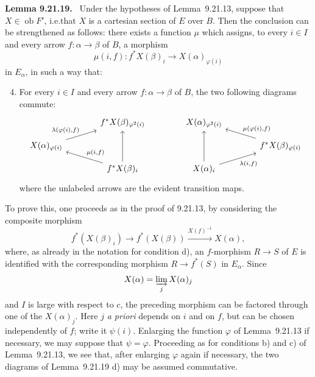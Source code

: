 \documentclass[11pt]{article}
\newcommand{\ob}{\operatorname{ob}}
\newcommand{\ie}{i.e.}
\newenvironment{statement}[1]{\par\medskip\noindent\textbf{#1.}\ }{\par\medskip}
\begin{document}
\begin{statement}{Lemma 9.21.19}
Under the hypotheses of Lemma~9.21.13, suppose that $X\in\ob F'$, \ie that $X$ is a cartesian section of $E$ over $B$. Then the conclusion can be strengthened as follows: there exists a function $\mu$ which assigns, to every $i\in I$ and every arrow $f:\alpha\to\beta$ of $B$, a morphism
\[
 \mu(i,f):f^\ast X(\beta)_i\longrightarrow X(\alpha)_{\varphi(i)}
\]
in $E_\alpha$, in such a way that:
\begin{enumerate}[label=\alph*)]
\setcounter{enumi}{3}
\item For every $i\in I$ and every arrow $f:\alpha\to\beta$ of $B$, the two following diagrams commute:
\[
\begin{tikzcd}[column sep=large,row sep=small]
& f^\ast X(\beta)_{\varphi^2(i)}\\
X(\alpha)_{\varphi(i)} \arrow[ru,"{\lambda(\varphi(i),f)}"] &\\
& f^\ast X(\beta)_i \arrow[lu,"{\mu(i,f)}"'] \arrow[uu]
\end{tikzcd}
\qquad\qquad
\begin{tikzcd}[column sep=large,row sep=small]
X(\alpha)_{\varphi^2(i)} &\\
& f^\ast X(\beta)_{\varphi(i)} \arrow[lu,"{\mu(\varphi(i),f)}"']\\
X(\alpha)_i \arrow[uu]\arrow[ru,"{\lambda(i,f)}"'] &
\end{tikzcd}
\]
where the unlabeled arrows are the evident transition maps.
\end{enumerate}
\end{statement}

To prove this, one proceeds as in the proof of 9.21.13, by considering the composite morphism
\[
 f^\ast(X(\beta)_i)\longrightarrow f^\ast(X(\beta))
 \xrightarrow{X(f)^{-1}} X(\alpha),
\]
where, as already in the notation for condition d), an $f$-morphism $R\to S$ of $E$ is identified with the corresponding morphism $R\to f^\ast(S)$ in $E_\alpha$. Since
\[
 X(\alpha)=\varinjlim_j X(\alpha)_j
\]
and $I$ is large with respect to $c$, the preceding morphism can be factored through one of the $X(\alpha)_j$. Here $j$ \emph{a priori} depends on $i$ and on $f$, but can be chosen independently of $f$; write it $\psi(i)$. Enlarging the function $\varphi$ of Lemma~9.21.13 if necessary, we may suppose that $\psi=\varphi$. Proceeding as for conditions b) and c) of Lemma~9.21.13, we see that, after enlarging $\varphi$ again if necessary, the two diagrams of Lemma~9.21.19 d) may be assumed commutative.
\end{document}

